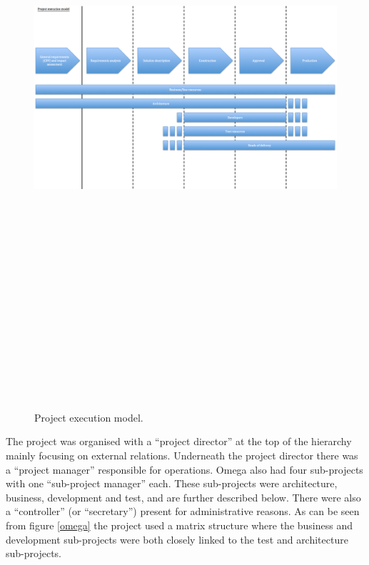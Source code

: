 \begin{figure}
\centering
\includegraphics[angle=90, trim = 0mm 0mm 20mm 0mm,width=160mm, height=230mm]{images/execution_model.png}
\caption{Project execution model.}
\label{project_execution}
\end{figure}

The project was organised with a ``project director'' at the top of the hierarchy mainly focusing on external relations. Underneath the project director there was a ``project manager'' responsible for operations. Omega also had four sub-projects with one ``sub-project manager'' each. These sub-projects were architecture, business, development and test, and are further described below. There were also a ``controller'' (or ``secretary'') present for administrative reasons. As can be seen from figure \ref{omega} the project used a matrix structure where the business and development sub-projects were both closely linked to the test and architecture sub-projects.

